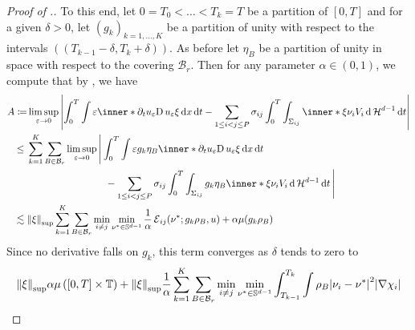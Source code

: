 \begin{proof}[Proof of .]
	To this end, let $ 0 = T_{ 0 } < \dotsc < T_{ k } = T $ be a partition of $ 
	[ 0 , T ] $ and for a given $ \delta > 0 $, let $ ( g_{ k } )_{ k = 1 , 
		\dotsc, K } $ be a partition of unity with respect to the intervals 
	$ \left( ( T_{ k - 1 } - \delta , T_{ k } + \delta ) \right) $. As before 
	let $ \eta_{ B } $ be a partition of unity in space with respect to the 
	covering $ \mathcal{ B }_{ r } $. Then for any parameter $ \alpha \in ( 0 , 
	1 ) $, we compute that by , we have
	\begin{align*}
		A \coloneqq&
		\limsup_{ \varepsilon \to 0 }
		\abs{
			\int_{ 0 }^{ T }
			\int
			\varepsilon
			\inner*{ \partial_{ t } 
				u_{ \varepsilon } }{ \diff u_{ \varepsilon } \xi }
			\dd{ x }
			\dd{ t }
			-
			\sum_{ 1 \leq i < j \leq P }
			\sigma_{ i j }
			\int_{ 0 }^{ T }
			\int_{ \Sigma_{ i j } }
			\inner*{ \xi }{ \nu_{ i } }
			V_{ i }
			\dd{ \hm^{ d -1 } }
			\dd{ t }
		}
		\\
		\leq{} &
		\sum_{ k = 1 }^{ K }
		\sum_{ B \in \mathcal{ B }_{ r } }
		\limsup_{ \varepsilon \to 0 }
		\Bigg{|}
		\int_{ 0 }^{ T }
		\int
		\varepsilon
		g_{ k } \eta_{ B }
		\inner*{ 
			\partial_{ t } u_{ \varepsilon } }{ \diff 
			u_{ \varepsilon } \xi }
		\dd{ x }
		\dd{ t }
		\\
		& \qquad \qquad \qquad \qquad-
		\sum_{ 1 \leq i < j \leq P }
		\sigma_{ i j }
		\int_{ 0 }^{ T }
		\int_{ \Sigma_{ i j } }
		g_{ k } \eta_{ B }
		\inner*{\xi }{ \nu_{ i } }
		V_{ i }
		\dd{ \hm^{ d - 1 } }
		\dd{ t }					
		\Bigg{|}
		\\
		\lesssim{} &
		\norm{ \xi }_{ \mathrm{sup} }
		\sum_{ k = 1 }^{ K }
		\sum_{ B \in \mathcal{ B }_{ r } }
		\min_{ i \neq j }
		\min_{ \nu^{ \ast } \in \mathbb{ S }^{ d - 1 } }
		\frac{ 1 }{ \alpha }
		\tilt_excess_{ i j } ( \nu^{ \ast } ; g_{ k } \rho_{ 
			B } , u )
		+
		\alpha \mu ( g_{ k } \rho_{ B } )
	\end{align*}
	Since no derivative falls on $ g_{ k } $, this term converges as $ \delta $ 
	tends to zero to
	\begin{align}
		\label{error_for _convergence_of_velocity}
		\norm{ \xi }_{ \mathrm{sup} }
		\alpha \mu \left( [ 0 , T ] \times \flattorus \right)
		+
		\norm{ \xi }_{ \mathrm{sup} }
		\frac{ 1 }{ \alpha }
		\sum_{ k = 1 }^{ K }
		\sum_{ B \in \mathcal{ B }_{ r } }
		& \min_{ i \neq j }
		\min_{ \nu^{ \ast } \in \mathbb{ S }^{ d - 1 } }
		\int_{ T_{ k - 1 } }^{ T_{ k } }
		\int
		\rho_{ B } 
		\abs{ \nu_{ i } - \nu^{ \ast } }^{ 2 }
		\abs{ \nabla \chi_{ i } }
		\\

\end{align}
\end{proof}

